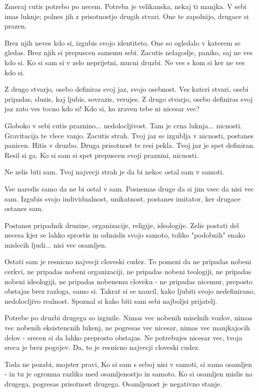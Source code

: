         

   Zmeraj cutis potrebo po necem. Potreba je velikanska, nekaj ti manjka. V sebi imas luknje; polnes jih z prisotnostjo drugih stvari. One te zapolnijo, drugace si prazen. 

Brez njih neves kdo si, izgubis svojo identiteto. One so ogledalo v katerem se gledas. Brez njih si prepuscen samemu sebi. Zacutis nelagodje, paniko, saj ne ves kdo si. Ko si sam si v zelo neprijetni, mucni druzbi. Ne ves s kom si ker ne ves kdo si. 

Z drugo stvarjo, osebo definiras svoj jaz, svojo osebnost. Ves kateri stvari, osebi pripadas, sluzis, kaj ljubis, sovrazis, verujes. Z drugo stvarjo, osebo definiras svoj jaz zato ves tocno kdo si! Kdo si, ko zraven tebe ni nicesar vec? 

Globoko v sebi cutis praznino... nedolocljivost. Tam je crna luknja... nicnosti. Gravitacija te vlece vanjo. Zacutis strah. Tvoj jaz se izgublja v nicnosti, postanes panicen. Hitis v druzbo. Druga prisotnost te resi pekla. Tvoj jaz je spet definiran. Resil si ga. Ko si sam si spet prepuscen svoji praznini, nicnosti. 

Ne zelis biti sam. Tvoj najvecji strah je da bi nekoc ostal sam v samoti. 

Vse naredis samo da ne bi ostal v sam. Posnemas druge da si jim vsec da nisi vec sam. Izgubis svojo individualnost, unikatnost, postanes imitator, ker drugace ostanes sam. 

Postanes pripadnik druzine, organizacije, religije, ideologije. Zelis postati del necesa kjer se lahko sprostis in odmislis svojo samoto, toliko "podobnih" enako mislecih ljudi... nisi vec osamljen. 

Ostati sam je resnicno najvecji cloveski cudez. To pomeni da ne pripadas nobeni cerkvi, ne pripadas nobeni organizaciji, ne pripadas nobeni teologiji, ne pripadas nobeni ideologiji, ne pripadas nobenemu cloveku - ne pripadas nicemur, preposto obstajas brez razloga, samo si. Takrat si se naucil, kako ljubiti svojo nedefinirano, nedolocljivo realnost. Spoznal si kako biti sam sebi najboljsi prijatelj. 

Potrebe po druzbi drugega so izginile. Nimas vec nobenih miselnih vozlov, nimas vec nobenih eksistencnih lukenj, ne pogresas vec nicesar, nimas vec manjkajocih delov - srecen si da lahko preprosto obstajas. Ne potrebujes nicesar vec, tvoja sreca je brez pogojev. Da, to je resnicno najvecji cloveski cudez. 

Toda ne pozabi, mojster pravi,  Ko si sam s seboj nisi v samoti, si samo osamljen - in tu je ogromna razlika med osamljenostjo in samoto. Ko si osamljen mislis na drugega, pogresas prisotnost drugega. Osamljenost je negativno stanje. 

